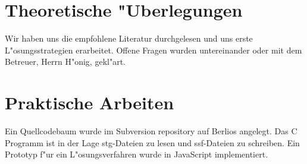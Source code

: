 \documentclass[12pt,a4paper]{article}
\begin{document}
\section{Theoretische "Uberlegungen}
Wir haben uns die empfohlene Literatur durchgelesen und uns 
erste L"osungsstrategien erarbeitet.
Offene Fragen wurden untereinander oder mit dem Betreuer,
Herrn H"onig, gekl"art.

\section{Praktische Arbeiten}
Ein Quellcodebaum wurde im Subversion repository auf Berlios
angelegt.
Das C Programm ist in der Lage stg-Dateien zu lesen und
ssf-Dateien zu schreiben.
Ein Prototyp f"ur ein L"osungsverfahren wurde in JavaScript
implementiert.
\end{document}
